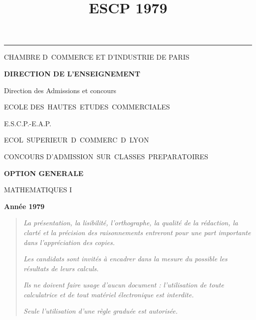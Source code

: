 \documentclass[11pt]{article}%
\title{\bf \vspace{-2cm} ESCP 1979} %
\author{} %
\date{} %
\begin{document}
\maketitle %
\vspace{-1.4cm}\hrule %
\thispagestyle{fancy}

\vspace*{.2cm}




\begin{center}
{\small CHAMBRE D\E\ COMMERCE ET D'INDUSTRIE DE PARIS}

\textbf{DIRECTION DE L'ENSEIGNEMENT}

Direction des Admissions et concours

\underline{\hspace*{3cm}}

{\Large ECOLE DES\ HAUTES\ ETUDES\ COMMERCIALES}

{\Large E.S.C.P.-E.A.P.}

{\Large ECOL\E\ SUPERIEUR\E\ D\E\ COMMERC\E\ D\E\ LYON}{\large }

CONCOURS D'ADMISSION\ SUR\ CLASSES\ PREPARATOIRES

\underline{\hspace*{3cm}}

\textbf{OPTION GENERALE}

{\Large MATHEMATIQUES I}

\textbf{Année 1979}

\underline{\hspace*{3cm}}
\end{center}

\begin{quotation}
\noindent \textsl{La présentation, la lisibilité, l'orthographe, la
qualité
de la rédaction, la clarté et la précision des raisonnements entreront
pour
une part importante dans l'appréciation des copies.}

\noindent \textsl{Les candidats sont invités à encadrer dans la mesure
du
possible les résultats de leurs calculs.}

\noindent \textsl{Ils ne doivent faire usage d'aucun document :
l'utilisation de toute calculatrice et de tout matériel électronique
est
interdite.}

\noindent \textsl{Seule l'utilisation d'une règle graduée est
autorisée.}

\noindent \textsl{\hrulefill }
\end{quotation}
\end{document}

